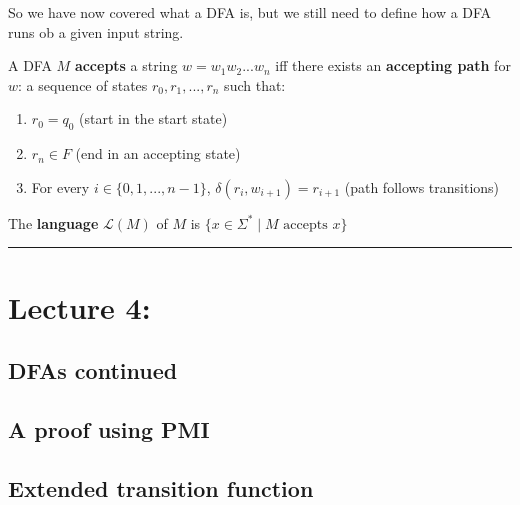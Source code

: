 \documentclass{article}
\begin{document}
So we have now covered what a DFA is, but we still need to define how a DFA runs ob a given input string.

\begin{tcolorbox} [title= Definition:, colback=black!10!white]
    A DFA $M$ \textbf{accepts} a string $w=w_1w_2...w_n$ iff there exists an \textbf{accepting path} for $w$: a sequence of states $r_0,r_1,...,r_n$ such that:
    \begin{enumerate}
        \item $r_0=q_0$ (start in the start state)
        \item $r_n\in F$ (end in an accepting state)
        \item For every $i\in\{0,1,...,n-1\}$, $\delta(r_i,w_{i+1})=r_{i+1}$ (path follows transitions)\footnotemark{}
    \end{enumerate}
\end{tcolorbox}



\begin{tcolorbox} [title= Definition:, colback=black!10!white]
    The \textbf{language} $\mathcal{L}(M)$ of $M$ is $\{x\in\Sigma^*\mid M \text{ accepts }x\}$
\end{tcolorbox}

\begin{center}
	\rule{450pt}{1pt} 
\end{center}
\newpage

\section*{Lecture 4:}

\subsection*{DFAs continued}

\subsection*{A proof using PMI}

\subsection*{Extended transition function}
\end{document}
